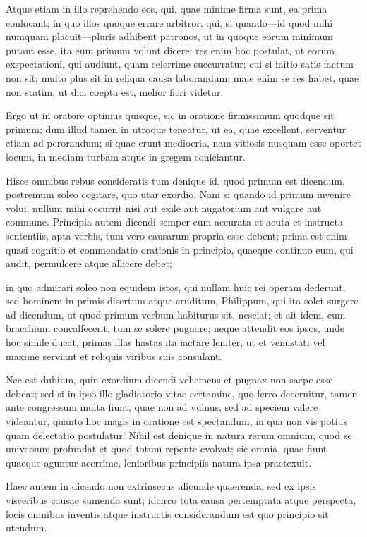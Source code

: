  Atque etiam in illo reprehendo eos, qui, quae minime firma sunt, ea prima conlocant; in quo illos quoque errare arbitror, qui, si quando—id quod mihi numquam placuit—pluris adhibent patronos, ut in quoque eorum minimum putant esse, ita eum primum volunt dicere: res enim hoc postulat, ut eorum exspectationi, qui audiunt, quam celerrime succurratur; cui si initio satis factum non sit; multo plus sit in reliqua causa laborandum; male enim se res habet, quae non statim, ut dici coepta est, melior fieri videtur.

 Ergo ut in oratore optimus quisque, sic in oratione firmissimum quodque sit primum; dum illud tamen in utroque teneatur, ut ea, quae excellent, serventur etiam ad perorandum; si quae erunt mediocria, nam vitiosis nusquam esse oportet locum, in mediam turbam atque in gregem coniciantur.

 Hisce omnibus rebus consideratis tum denique id, quod primum est dicendum, postremum soleo cogitare, quo utar exordio. Nam si quando id primum invenire volui, nullum mihi occurrit nisi aut exile aut nugatorium aut vulgare aut commune. Principia autem dicendi semper cum accurata et acuta et instructa sententiis, apta verbis, tum vero causarum propria esse debent; prima est enim quasi cognitio et commendatio orationis in principio, quaeque continuo eum, qui audit, permulcere atque allicere debet;

 in quo admirari soleo non equidem istos, qui nullam huic rei operam dederunt, sed hominem in primis disertum atque eruditum, Philippum, qui ita solet surgere ad dicendum, ut quod primum verbum habiturus sit, nesciat; et ait idem, cum bracchium concalfecerit, tum se solere pugnare; neque attendit eos ipsos, unde hoc simile ducat, primas illas hastas ita iactare leniter, ut et venustati vel maxime serviant et reliquis viribus suis consulant.

 Nec est dubium, quin exordium dicendi vehemens et pugnax non saepe esse debeat; sed si in ipso illo gladiatorio vitae certamine, quo ferro decernitur, tamen ante congressum multa fiunt, quae non ad vulnus, sed ad speciem valere videantur, quanto hoc magis in oratione est spectandum, in qua non vis potius quam delectatio postulatur! Nihil est denique in natura rerum omnium, quod se universum profundat et quod totum repente evolvat; sic omnia, quae fiunt quaeque aguntur acerrime, lenioribus principiis natura ipsa praetexuit.

 Haec autem in dicendo non extrinsecus alicunde quaerenda, sed ex ipsis visceribus causae sumenda sunt; idcirco tota causa pertemptata atque perspecta, locis omnibus inventis atque instructis considerandum est quo principio sit utendum.

